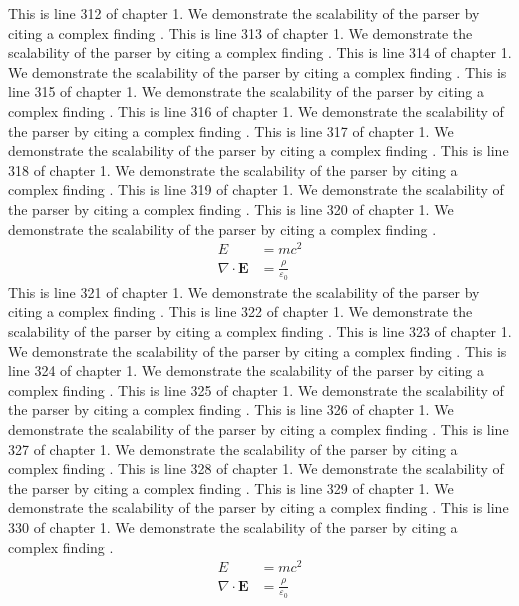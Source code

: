 This is line 312 of chapter 1. We demonstrate the scalability of the parser by citing a complex finding \cite{ref1_312}.
This is line 313 of chapter 1. We demonstrate the scalability of the parser by citing a complex finding \cite{ref1_313}.
This is line 314 of chapter 1. We demonstrate the scalability of the parser by citing a complex finding \cite{ref1_314}.
This is line 315 of chapter 1. We demonstrate the scalability of the parser by citing a complex finding \cite{ref1_315}.
This is line 316 of chapter 1. We demonstrate the scalability of the parser by citing a complex finding \cite{ref1_316}.
This is line 317 of chapter 1. We demonstrate the scalability of the parser by citing a complex finding \cite{ref1_317}.
This is line 318 of chapter 1. We demonstrate the scalability of the parser by citing a complex finding \cite{ref1_318}.
This is line 319 of chapter 1. We demonstrate the scalability of the parser by citing a complex finding \cite{ref1_319}.
This is line 320 of chapter 1. We demonstrate the scalability of the parser by citing a complex finding \cite{ref1_320}.
\begin{align*}
  E &= mc^2 \\
  \nabla \cdot \mathbf{E} &= \frac{\rho}{\varepsilon_0}
\end{align*}
This is line 321 of chapter 1. We demonstrate the scalability of the parser by citing a complex finding \cite{ref1_321}.
This is line 322 of chapter 1. We demonstrate the scalability of the parser by citing a complex finding \cite{ref1_322}.
This is line 323 of chapter 1. We demonstrate the scalability of the parser by citing a complex finding \cite{ref1_323}.
This is line 324 of chapter 1. We demonstrate the scalability of the parser by citing a complex finding \cite{ref1_324}.
This is line 325 of chapter 1. We demonstrate the scalability of the parser by citing a complex finding \cite{ref1_325}.
This is line 326 of chapter 1. We demonstrate the scalability of the parser by citing a complex finding \cite{ref1_326}.
This is line 327 of chapter 1. We demonstrate the scalability of the parser by citing a complex finding \cite{ref1_327}.
This is line 328 of chapter 1. We demonstrate the scalability of the parser by citing a complex finding \cite{ref1_328}.
This is line 329 of chapter 1. We demonstrate the scalability of the parser by citing a complex finding \cite{ref1_329}.
This is line 330 of chapter 1. We demonstrate the scalability of the parser by citing a complex finding \cite{ref1_330}.
\begin{align*}
  E &= mc^2 \\
  \nabla \cdot \mathbf{E} &= \frac{\rho}{\varepsilon_0}
\end{align*}
